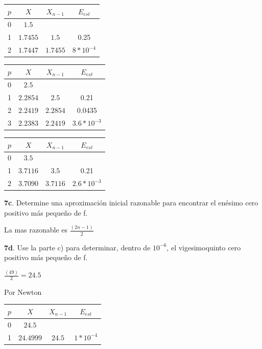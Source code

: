 \documentclass[12pt]{article}
\begin{document}
\begin{center}
    \begin{tabular}{|c|c|c|c|}
        \hline
        $p$&$X$&$X_{n-1}$&$E_{est}$\\
        \hline
        0 & $1.5$&  & \\
        1 &$1.7455$&$1.5$&0.25\\
        2 &$1.7447$&$1.7455$&$8*10^{-4}$\\
        \hline
      \end{tabular} 
\end{center}



\begin{center}
    \begin{tabular}{|c|c|c|c|}
        \hline
        $p$&$X$&$X_{n-1}$&$E_{est}$\\
        \hline
        0 & $2.5$&  & \\
        1 &$2.2854$&$2.5$&0.21\\
        2 &$2.2419$&$2.2854$&0.0435\\
        3 &$2.2383$&$2.2419$&$3.6*10^{-3}$\\
        \hline
      \end{tabular} 
\end{center}



\begin{center}
    \begin{tabular}{|c|c|c|c|}
        \hline
        $p$&$X$&$X_{n-1}$&$E_{est}$\\
        \hline
        0 & $3.5$&  & \\
        1 &$3.7116$&$3.5$&0.21\\
        2 &$3.7090$&$3.7116$&$2.6*10^{-3}$\\
        \hline
      \end{tabular} 
\end{center}

\textbf{7c}. Determine una aproximación inicial razonable para encontrar el enésimo cero positivo más pequeño de f.

La mas razonable es $\frac{(2n-1)}{2}$


\textbf{7d}. Use la parte c) para determinar, dentro de $10^{-6}$, el vigesimoquinto cero positivo más pequeño de f.

$\frac{(49)}{2} = 24.5$

Por Newton

\begin{center}
    \begin{tabular}{|c|c|c|c|}
        \hline
        $p$&$X$&$X_{n-1}$&$E_{est}$\\
        \hline
        0 & $24.5$&  & \\
        1 &$24.4999$&$24.5$&$1*10^{-4}$\\
        \hline
      \end{tabular} 
\end{center}
\end{document}
